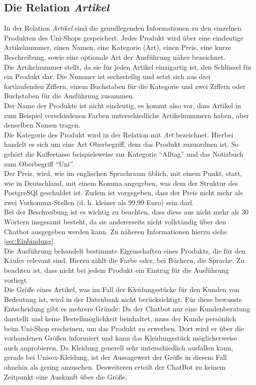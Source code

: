 \subsection{Die Relation \textit{Artikel}}
\label{sec:Artikel}

In der Relation \textit{Artikel} sind die grundlegenden Informationen zu den einzelnen Produkten des Uni-Shops gespeichert. Jedes Produkt wird über eine eindeutige Artikelnummer, einen Namen, eine Kategorie (Art), einen Preis, eine kurze Beschreibung, sowie eine optionale Art der Ausführung näher bezeichnet.\\
Die Artikelnummer stellt, da sie für jeden Artikel einzigartig ist, den Schlüssel für ein Produkt dar. Die Nummer ist sechsstellig und setzt sich aus drei fortlaufenden Ziffern, einem Buchstaben für die Kategorie und zwei Ziffern oder Buchstaben für die Ausführung zusammen.\\
Der Name der Produkte ist nicht eindeutig, es kommt also vor, dass Artikel in zum Beispiel verschiedenen Farben unterschiedliche Artikelnummern haben, aber denselben Namen tragen.\\
Die Kategorie des Produkt wird in der Relation mit \textit{Art} bezeichnet. Hierbei handelt es sich um eine Art Oberbegriff, dem das Produkt zuzuordnen ist. So gehört die Kaffeetasse beispielsweise zur Kategorie "`Alltag"' und das Notizbuch zum Oberbegriff "`Uni"'.\\
Der Preis, wird, wie im englischen Sprachraum üblich, mit einem Punkt, statt, wie in Deutschland, mit einem Komma angegeben, was dem der Struktur des PostgreSQl geschuldet ist. Zudem ist vorgegeben, dass der Preis nicht mehr als zwei Vorkomma-Stellen (d. h. kleiner als 99,99 Euro) sein darf.\\
Bei der Beschreibung ist es wichtig zu beachten, dass diese aus nicht mehr als 30 Wörtern insgesamt besteht, da sie andererseits nicht vollständig über den Chatbot ausgegeben werden kann. Zu näheren Informationen hierzu siehe \ref{sec:Einbindung}.\\
Die Ausführung behandelt bestimmte Eigenschaften eines Produkts, die für den Käufer relevant sind. Hierzu zählt die Farbe oder, bei Büchern, die Sprache. Zu beachten ist, dass nicht bei jedem Produkt ein Eintrag für die Ausführung vorliegt.\\
Die Größe eines Artikel, was im Fall der Kleidungsstücke für den Kunden von Bedeutung ist, wird in der Datenbank nicht berücksichtigt. Für diese bewusste Entscheidung gibt es mehrere Gründe: Da der Chatbot nur eine Kundenberatung darstellt und keine Bestellmöglichkeit beinhaltet, muss der Kunde persönlich beim Uni-Shop erscheinen, um das Produkt zu erwerben. Dort wird er über die vorhandenen Größen informiert und kann das Kleidungsstück möglicherweise auch anprobieren. Da Kleidung generell sehr unterschiedlich ausfallen kann, gerade bei Unisex-Kleidung, ist der Aussagewert der Größe in diesem Fall ohnehin als gering anzusehen. Desweiteren erteilt der ChatBot zu keinem Zeitpunkt eine Auskunft über die Größe.\\
